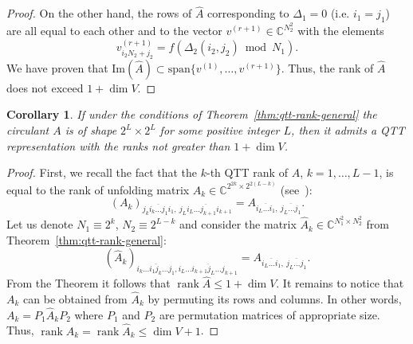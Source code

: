 \documentclass[a4paper]{article}
\newtheorem{corollary}{Corollary}[section]
\newcommand{\LL}{L}
\newcommand{\base}{2}
\DeclareMathOperator{\rank}{rank}
\begin{document}
\begin{proof}
		On the other hand, the rows of $\widehat{A}$ corresponding to $\Delta_1 = 0$ (i.e. $i_1 = j_1$) are all equal to each other and to the vector $v^{(r+1)} \in \mathbb{C}^{N_2^2}$ with the elements
		\[
		v^{(r+1)}_{i_2N_2+j_2} = f(\Delta_2(i_2, j_2) \bmod N_1).
		\]
		We have proven that $\mathrm{Im}(\widehat{A}) \subset \mathrm{span}\{v^{(1)}, \dots, v^{(r+1)}\}$.
		Thus, the rank of $\widehat{A}$ does not exceed $1 + \dim V$.
	\end{proof}
    \begin{corollary}
        If under the conditions of Theorem~\ref{thm:qtt-rank-general} 
        the circulant $A$ is of shape ${\base^\LL \times \base^\LL}$ for some positive integer $\LL$,
        then it admits a QTT representation with the ranks not greater than $1 + \dim V$.
    \end{corollary}
    \begin{proof}
    First, we recall the fact that the $k$-th QTT rank of $A$, $k = 1,\dots,\LL-1$, is equal to the rank of unfolding matrix $A_k \in \mathbb{C}^{\base^{2k} \times \base^{2(\LL-k)}}$ (see~\cite{osel-tt-2011}):
    \[
    (A_k)_{\overline{j_ki_k\dots j_1i_1},~\overline{j_{\LL}i_{\LL}\dots j_{k+1}i_{k+1}}} = A_{\overline{i_{\LL}\dots i_1},~\overline{j_{\LL}\dots j_1}}.
    \]
    Let us denote $N_1 \equiv \base^k$, $N_2 \equiv \base^{\LL-k}$ and consider the matrix $\widehat{A}_k \in \mathbb{C}^{N_1^2 \times N_2^2}$ from Theorem~\ref{thm:qtt-rank-general}:
    \[
    (\widehat{A}_k)_{\overline{i_k\dots i_1 j_k \dots j_1}, \overline{i_\LL\dots i_{k+1} j_\LL \dots j_{k+1}}} = A_{\overline{i_{\LL}\dots i_1},~\overline{j_{\LL}\dots j_1}}.
    \]
    From the Theorem it follows that $\rank \widehat{A} \le 1 + \dim V$.
    It remains to notice that $A_k$ can be obtained from $\widehat{A}_k$ by permuting its rows and columns.
    In other words, $A_k = P_1 \widehat{A}_k P_2$ where $P_1$ and $P_2$ are permutation matrices of appropriate size.
    Thus, $\rank A_k = \rank \widehat{A}_k \le \dim V + 1$.
    \end{proof}
    
\end{document}
